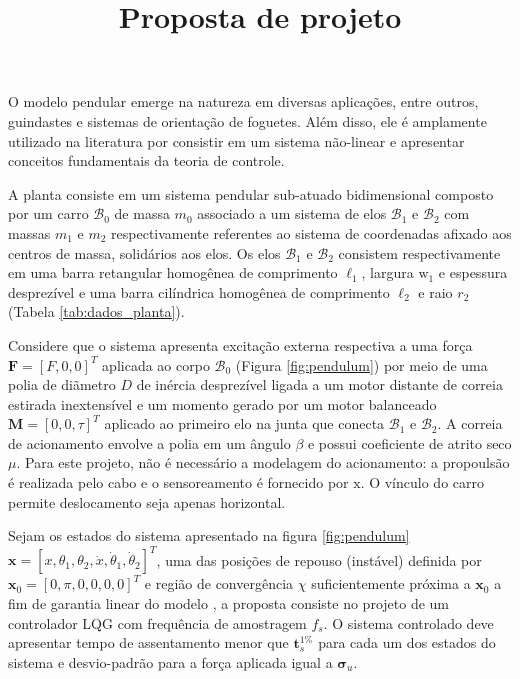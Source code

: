 \documentclass[a4paper, twoside]{article}
\title{Proposta de projeto}
\author{\studentname \qquad \uspid \qquad \uspmail}
\begin{document}
    
    \maketitle
    \thispagestyle{fancy}

    O modelo pendular emerge na natureza em diversas aplicações, entre outros, guindastes e sistemas de orientação de foguetes. Além disso, ele é amplamente utilizado na literatura por consistir em um sistema não-linear e apresentar conceitos fundamentais da teoria de controle. 
    
    A planta consiste em um sistema pendular sub-atuado bidimensional composto por um carro $\mathcal{B}_0$ de massa $m_0$ associado a um sistema de elos $\mathcal{B}_1$ e $\mathcal{B}_2$ com massas $m_1$ e $m_2$ respectivamente referentes ao sistema de coordenadas afixado aos centros de massa, solidários aos elos. Os elos $\mathcal{B}_1$ e $\mathcal{B}_2$ consistem respectivamente em uma barra retangular homogênea de comprimento $\ell_1$, largura $\mathrm{w}_1$ e espessura desprezível e uma barra cilíndrica homogênea de comprimento $\ell_2$ e raio $r_2$ (Tabela \ref{tab:dados_planta}).
    
    Considere que o sistema apresenta excitação externa respectiva a uma força $\mathbf{F} = [F, 0, 0]^T$ aplicada ao corpo $\mathcal{B}_0$ (Figura \ref{fig:pendulum}) por meio de uma polia de diãmetro $D$ de inércia desprezível ligada a um motor distante de correia estirada inextensível e um momento gerado por um motor balanceado $\mathbf{M} = [0, 0, \tau]^T$ aplicado ao primeiro elo na junta que conecta $\mathcal{B}_1$ e $\mathcal{B}_2$. A correia de acionamento envolve a polia em um ângulo $\beta$ e possui coeficiente de atrito seco $\mu$. Para este projeto, não é necessário a modelagem do acionamento: a propoulsão é realizada pelo cabo e o sensoreamento é fornecido por $\mathrm{x}$. O vínculo do carro permite deslocamento seja apenas horizontal.
    
    Sejam os estados do sistema apresentado na figura \ref{fig:pendulum} $\mathbf{x} = [x, \theta_1, \theta_2, \dot x, \dot \theta_1, \dot \theta_2]^T$, uma das posições de repouso (instável) definida por $\mathbf{x}_{0} = [0, \pi, 0, 0, 0, 0]^T$ e região de convergência $\chi$ suficientemente próxima a $\mathbf{x}_{0}$ a fim de garantia linear do modelo \cite{Adamy2009}, a proposta consiste no projeto de um controlador LQG com frequência de amostragem $f_s$. O sistema controlado deve apresentar tempo de assentamento menor que $\mathbf{t}_s^{1\%}$ para cada um dos estados do sistema e desvio-padrão para a força aplicada igual a $\mathbf{\sigma}_u$. 
    
\end{document}
